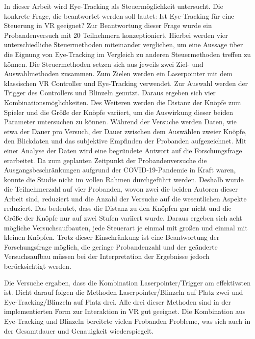 In dieser Arbeit wird Eye-Tracking als Steuermöglichkeit untersucht. Die konkrete Frage, die beantwortet werden soll lautet: \glqq Ist Eye-Tracking für eine Steuerung in \ac{VR} geeignet?\grqq{} Zur Beantwortung dieser Frage wurde ein Probandenversuch mit 20 Teilnehmern konzeptioniert. Hierbei werden vier unterschiedliche Steuermethoden miteinander verglichen, um eine Aussage über die Eignung von Eye-Tracking im Vergleich zu anderen Steuermethoden treffen zu können. Die Steuermethoden setzen sich aus jeweils zwei Ziel- und Auswahlmethoden zusammen. Zum Zielen werden ein Laserpointer mit dem klassischen \ac{VR} Controller und Eye-Tracking verwendet. Zur Auswahl werden der Trigger des Controllers und Blinzeln genutzt. Daraus ergeben sich vier Kombinationsmöglichkeiten. Des Weiteren werden die Distanz der Knöpfe zum Spieler und die Größe der Knöpfe variiert, um die Auswirkung dieser beiden Parameter untersuchen zu können. Während der Versuche werden Daten, wie etwa der Dauer pro Versuch, der Dauer zwischen dem Auswählen zweier Knöpfe, den Blickdaten und das subjektive Empfinden der Probanden aufgezeichnet. Mit einer Analyse der Daten wird eine begründete Antwort auf die Forschungsfrage erarbeitet. Da zum geplanten Zeitpunkt der Probandenversuche die Ausgangsbeschränkungen aufgrund der \ac{COVID-19}-Pandemie in Kraft waren, konnte die Studie nicht im vollen Rahmen durchgeführt werden. Deshalb wurde die Teilnehmerzahl auf vier Probanden, wovon zwei die beiden Autoren dieser Arbeit sind, reduziert und die Anzahl der Versuche auf die wesentlichen Aspekte reduziert. Das bedeutet, dass die Distanz zu den Knöpfen gar nicht und die Größe der Knöpfe nur auf zwei Stufen variiert wurde. Daraus ergeben sich acht mögliche Versuchsaufbauten, jede Steuerart je einmal mit großen und einmal mit kleinen Knöpfen. Trotz dieser Einschränkung ist eine Beantwortung der Forschungsfrage möglich, die geringe Probandenzahl und der geänderte Versuchsaufbau müssen bei der Interpretation der Ergebnisse jedoch berücksichtigt werden. 

Die Versuche ergaben, dass die Kombination Laserpointer/Trigger am effektivsten ist. Dicht darauf folgen die Methoden Laserpointer/Blinzeln auf Platz zwei und Eye-Tracking/Blinzeln auf Platz drei. Alle drei dieser Methoden sind in der implementierten Form zur Interaktion in \ac{VR} gut geeignet. Die Kombination aus Eye-Tracking und Blinzeln bereitete vielen Probanden Probleme, was sich auch in der Gesamtdauer und Genauigkeit wiederspiegelt. 
